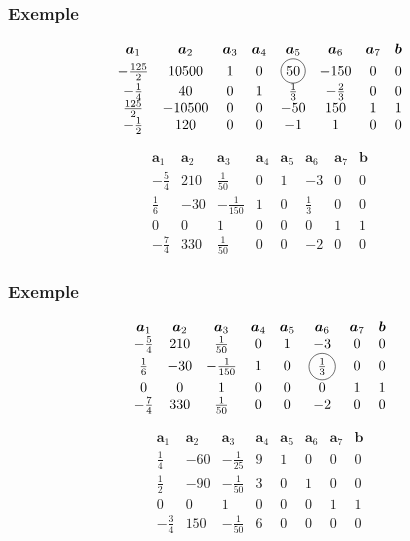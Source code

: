 \documentclass[t,usepdftitle=false]{beamer}
\newcommand*\circled[1]{\tikz[baseline=(char.base)]{
    \node[shape=circle,draw,inner sep=2pt] (char) {#1};}}
\def\ba{\boldsymbol{a}}
\def\bb{\boldsymbol{b}}
\begin{document}
\begin{frame}
	\frametitle{Exemple}
	
	\[
	\begin{matrix}
		\ba_1 & \ba_2 & \ba_3 & \ba_4 & \ba_5 &\ba_6 &\ba_7 & \bb \\
		-\frac{125}{2} & 10500 & 1 & 0 & \circled{50} & -150 & 0 & 0 \\
		-\frac{1}{4} & 40 & 0 & 1 & \frac{1}{3} & -\frac{2}{3} & 0 & 0 \\
		\frac{125}{2} & -10500 & 0 & 0 & -50 & 150 & 1 & 1 \\
		-\frac{1}{2} & 120 & 0 & 0 & -1 & 1 & 0 & 0
	\end{matrix}
	\]
	
	\[
	\begin{matrix}
		\ba_1 & \ba_2 & \ba_3 & \ba_4 & \ba_5 &\ba_6 &\ba_7 & \bb \\
		-\frac{5}{4} & 210 & \frac{1}{50} & 0 & 1 & -3 & 0 & 0 \\
		\frac{1}{6} & -30 & -\frac{1}{150} & 1 & 0 & \frac{1}{3} & 0 & 0 \\
		0 & 0 & 1 & 0 & 0 & 0 & 1 & 1 \\
		-\frac{7}{4} & 330 & \frac{1}{50} & 0 & 0 & -2 & 0 & 0
	\end{matrix}
	\]
	
\end{frame}

\begin{frame}
	\frametitle{Exemple}
	
	\[
	\begin{matrix}
		\ba_1 & \ba_2 & \ba_3 & \ba_4 & \ba_5 &\ba_6 &\ba_7 & \bb \\
		-\frac{5}{4} & 210 & \frac{1}{50} & 0 & 1 & -3 & 0 & 0 \\
		\frac{1}{6} & -30 & -\frac{1}{150} & 1 & 0 & \circled{$\frac{1}{3}$} & 0 & 0 \\
		0 & 0 & 1 & 0 & 0 & 0 & 1 & 1 \\
		-\frac{7}{4} & 330 & \frac{1}{50} & 0 & 0 & -2 & 0 & 0
	\end{matrix}
	\]
	
	\[
	\begin{matrix}
		\ba_1 & \ba_2 & \ba_3 & \ba_4 & \ba_5 &\ba_6 &\ba_7 & \bb \\
		\frac{1}{4} & -60 & -\frac{1}{25} & 9 & 1 & 0 & 0 & 0 \\
		\frac{1}{2} & -90 & -\frac{1}{50} & 3 & 0 & 1 & 0 & 0 \\
		0 & 0 & 1 & 0 & 0 & 0 & 1 & 1 \\
		-\frac{3}{4} & 150 & -\frac{1}{50} & 6 & 0 & 0 & 0 & 0
	\end{matrix}
	\]
	
\end{frame}
\end{document}
